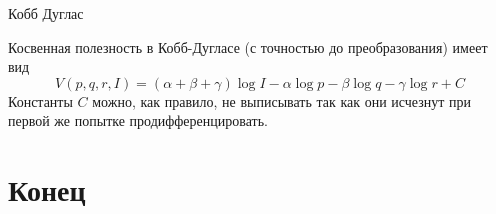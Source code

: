 \documentclass{beamer}
\begin{document}
\begin{frame}{Кобб Дуглас}

Косвенная полезность в Кобб-Дугласе (с точностью до преобразования) имеет вид
$$V(p,q,r,I) = (\alpha + \beta + \gamma) \log I - \alpha \log p - \beta \log q - \gamma \log r + C $$
Константы $C$ можно, как правило, не выписывать так как они исчезнут при первой же попытке продифференцировать.

\end{frame}

\section{Конец}
\end{document}
